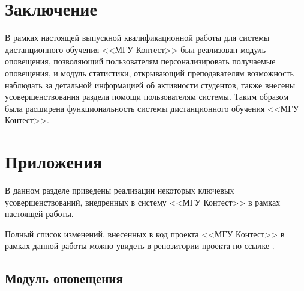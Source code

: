 \documentclass[12pt, a4paper, oneside]{article}
\begin{document}
\section{Заключение}
В рамках настоящей выпускной квалификационной работы для системы дистанционного обучения <<МГУ Контест>> был реализован модуль оповещения, позволяющий пользователям персонализировать получаемые оповещения, и модуль статистики, открывающий преподавателям возможность наблюдать за детальной информацией об активности студентов, также внесены усовершенствования раздела помощи пользователям системы. Таким образом была расширена функциональность системы дистанционного обучения <<МГУ Контест>>.
\newpage

\section{Приложения}
В данном разделе приведены реализации некоторых ключевых усовершенствований, внедренных в систему <<МГУ Контест>> в рамках настоящей работы.

Полный список изменений, внесенных в код проекта <<МГУ Контест>> в рамках данной работы можно увидеть в репозитории проекта по ссылке \cite{msu-contest-commits}.
\subsection{Модуль оповещения}
\end{document}
